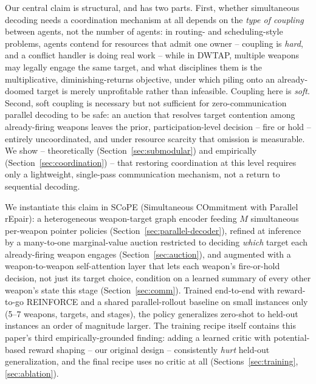 Our central claim is structural, and has two parts. First, whether simultaneous decoding needs a coordination mechanism at all depends on the \emph{type of coupling} between agents, not the number of agents: in routing- and scheduling-style problems, agents contend for resources that admit one owner -- coupling is \emph{hard}, and a conflict handler is doing real work -- while in DWTAP, multiple weapons may legally engage the same target, and what disciplines them is the multiplicative, diminishing-returns objective, under which piling onto an already-doomed target is merely unprofitable rather than infeasible. Coupling here is \emph{soft}. Second, soft coupling is necessary but not sufficient for zero-communication parallel decoding to be safe: an auction that resolves target contention among already-firing weapons leaves the prior, participation-level decision -- fire or hold -- entirely uncoordinated, and under resource scarcity that omission is measurable. We show -- theoretically (Section~\ref{sec:submodular}) and empirically (Section~\ref{sec:coordination}) -- that restoring coordination at this level requires only a lightweight, single-pass communication mechanism, not a return to sequential decoding.

We instantiate this claim in SCoPE (Simultaneous COmmitment with Parallel rEpair): a heterogeneous weapon-target graph encoder feeding $M$ simultaneous per-weapon pointer policies (Section~\ref{sec:parallel-decoder}), refined at inference by a many-to-one marginal-value auction restricted to deciding \emph{which} target each already-firing weapon engages (Section~\ref{sec:auction}), and augmented with a weapon-to-weapon self-attention layer that lets each weapon's fire-or-hold decision, not just its target choice, condition on a learned summary of every other weapon's state this stage (Section~\ref{sec:comm}). Trained end-to-end with reward-to-go REINFORCE and a shared parallel-rollout baseline on small instances only (5--7 weapons, targets, and stages), the policy generalizes zero-shot to held-out instances an order of magnitude larger. The training recipe itself contains this paper's third empirically-grounded finding: adding a learned critic with potential-based reward shaping -- our original design -- consistently \emph{hurt} held-out generalization, and the final recipe uses no critic at all (Sections~\ref{sec:training}, \ref{sec:ablation}).

